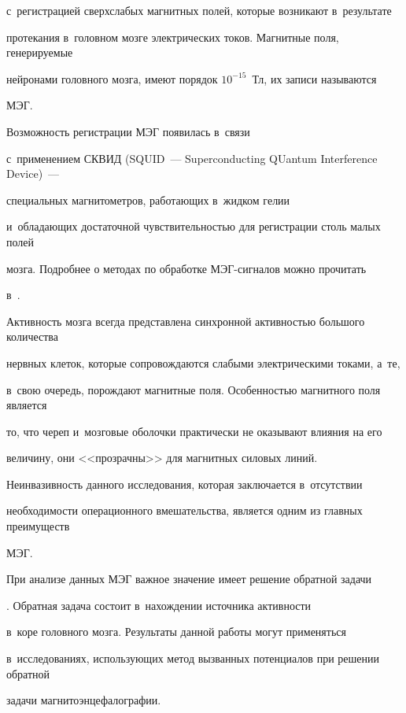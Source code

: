с~регистрацией сверхслабых магнитных полей, которые возникают в~результате 

протекания в~головном мозге электрических токов. Магнитные поля, генерируемые 

нейронами головного мозга, имеют  порядок $10^{-15}$~Тл, их записи называются 

МЭГ.

Возможность регистрации МЭГ появилась в~связи 

с~применением СКВИД (SQUID~--- Superconducting QUantum Interference Device)~--- 

специальных магнитометров, работающих в~жидком гелии 

и~обладающих достаточной чувствительностью для регистрации столь малых полей 

мозга. Подробнее о методах по обработке МЭГ-сиг\-на\-лов можно прочитать 

в~\cite{hamalainen, seven_authors}.



Активность мозга всегда представлена синхронной активностью большого количества 

нервных клеток, которые сопровождаются слабыми электрическими токами, а~те, 

в~свою очередь, порождают магнитные поля. Особенностью магнитного поля является 

то, что череп и~мозговые оболочки практически не оказывают влияния на его 

величину, они <<прозрачны>> для магнитных силовых линий.



Неинвазивность данного исследования, которая заключается в~отсутствии 

необходимости операционного вмешательства, является одним из главных преимуществ 

МЭГ.



При анализе данных МЭГ важное значение имеет решение обратной задачи 

\cite{zah_bening}. Обратная задача состоит в~нахождении источника активности 

в~коре головного мозга. Результаты данной работы могут применяться 

в~исследованиях, использующих метод вызванных потенциалов при решении обратной 

задачи магнитоэнцефалографии.





